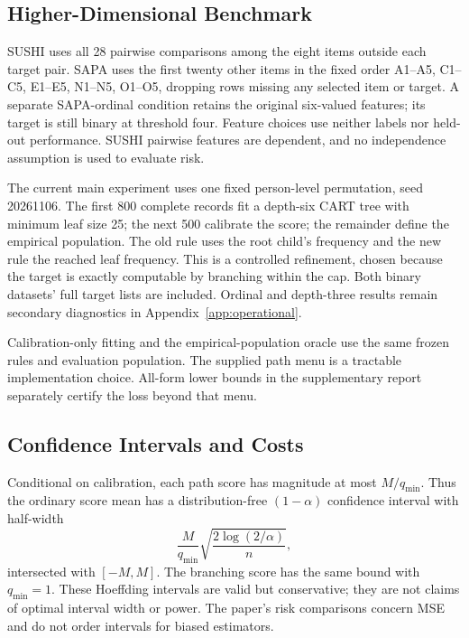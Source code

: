 \subsection{Higher-Dimensional Benchmark}
SUSHI uses all 28 pairwise comparisons among the eight items outside each target pair. SAPA uses the first twenty other items in the fixed order A1--A5, C1--C5, E1--E5, N1--N5, O1--O5, dropping rows missing any selected item or target. A separate SAPA-ordinal condition retains the original six-valued features; its target is still binary at threshold four. Feature choices use neither labels nor held-out performance. SUSHI pairwise features are dependent, and no independence assumption is used to evaluate risk.

The current main experiment uses one fixed person-level permutation, seed 20261106. The first 800 complete records fit a depth-six CART tree with minimum leaf size 25; the next 500 calibrate the score; the remainder define the empirical population. The old rule uses the root child's frequency and the new rule the reached leaf frequency. This is a controlled refinement, chosen because the target is exactly computable by branching within the cap. Both binary datasets' full target lists are included. Ordinal and depth-three results remain secondary diagnostics in Appendix~\ref{app:operational}.

Calibration-only fitting and the empirical-population oracle use the same frozen rules and evaluation population. The supplied path menu is a tractable implementation choice. All-form lower bounds in the supplementary report separately certify the loss beyond that menu.

\subsection{Confidence Intervals and Costs}
Conditional on calibration, each path score has magnitude at most $M/q_{\min}$. Thus the ordinary score mean has a distribution-free $(1-\alpha)$ confidence interval with half-width
\[
 \frac{M}{q_{\min}}\sqrt{\frac{2\log(2/\alpha)}n},
\]
intersected with $[-M,M]$. The branching score has the same bound with $q_{\min}=1$. These Hoeffding intervals are valid but conservative; they are not claims of optimal interval width or power. The paper's risk comparisons concern MSE and do not order intervals for biased estimators.

